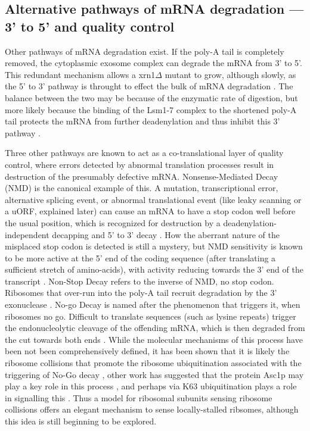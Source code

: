 \subsection{Alternative pathways of mRNA degradation ---
3' to 5' and quality control}

Other pathways
of mRNA degradation exist. If the poly-A tail is completely removed,
the cytoplasmic exosome complex can degrade the mRNA from 3' to 5'.
This redundant mechanism allows a xrn1$\Delta$ mutant to grow, although
slowly, as the 5' to 3' pathway is throught to effect the bulk of mRNA
degradation \parencite{parker2012rna}. 
The balance between the two may be because
of the enzymatic rate of digestion, but more likely because the
binding of the Lsm1-7 complex to the shortened poly-A tail protects
the mRNA from further deadenylation and thus inhibit this 3' pathway
\parencite{tharun2009lsm1}.

Three other pathways are known to act as a
co-translational layer of quality control, where errors detected by
abnormal translation processes result in destruction of the presumably
defective mRNA. Nonsense-Mediated Decay (NMD) is the canonical example
of this. A mutation, transcriptional error, alternative splicing
event, or abnormal translational event (like leaky scanning or a uORF,
explained later) can cause an mRNA to have a stop codon well before
the usual position, which is recognized for destruction by a
deadenylation-independent decapping and 5' to 3' decay 
\parencite{muhlrad1994premature}. 
How the aberrant nature of the misplaced stop codon is
detected is still a mystery, but NMD sensitivity is known to be
more active at the 5' end of the coding sequence (after translating
a sufficient stretch of amino-acids), with activity reducing
towards the 3' end of the transcript
\parencite{losson1979interference}. 
Non-Stop Decay refers to the inverse of
NMD, no stop codon. Ribosomes that over-run into the poly-A tail
recruit degradation by the 3' exonuclease 
\parencite{schmid2008exosome}. No-go Decay is
named after the phenomenon that triggers it, when ribosomes no go.
Difficult to translate sequences (such as lysine repeats) trigger the
endonucleolytic cleavage of the offending mRNA, which is then degraded
from the cut towards both ends 
\parencite{doma2006endonucleolytic}. While the molecular mechanisms of
this process have been not been comprehensively defined, 
it has been shown that it is likely the ribosome collisions that
promote the ribosome ubiquitination associated with the triggering of
No-Go decay 
\parencite{simms2017ribosome}, other work has suggested that the
protein Asc1p may play a key role in this process 
\parencite{ikeuchi2016ribosome}, and perhaps via K63 ubiquitination 
plays a role in signalling this
\parencite{saito2015inhibiting}. Thus a model for ribosomal subunits
sensing ribosome collisions offers an elegant mechanism to sense
locally-stalled ribsomes, although this idea is still beginning to be
explored.

